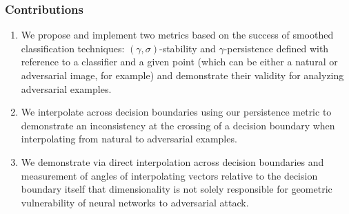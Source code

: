 





\begin{frame}
  \frametitle{Contributions}
 \begin{enumerate}
     \item We propose and implement two metrics based on the success of smoothed classification techniques:  $(\gamma,\sigma)$-stability and $\gamma$-persistence defined with reference to a classifier and a given point (which can be either a natural or adversarial image, for example) and demonstrate their validity for analyzing adversarial examples. 
     \item We interpolate across decision boundaries using our persistence metric to demonstrate an inconsistency at the crossing of a decision boundary when interpolating from natural to adversarial examples.
     \item We demonstrate via direct interpolation across decision boundaries and measurement of angles of interpolating vectors relative to the decision boundary itself that dimensionality is not solely responsible for geometric vulnerability of neural networks to adversarial attack. 
 \end{enumerate}
 \end{frame}

